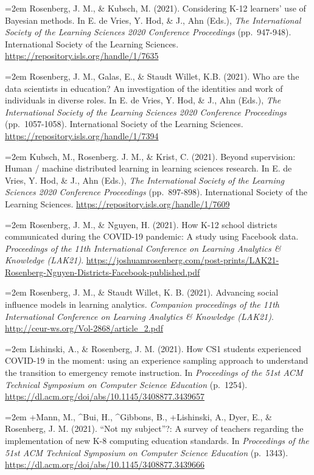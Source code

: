 \documentclass[
  14,
]{article}
\begin{document}
\hangindent=2em Rosenberg, J. M., \& Kubsch, M. (2021). Considering K-12
learners' use of Bayesian methods. In E. de Vries, Y. Hod, \& J., Ahn
(Eds.), \emph{The International Society of the Learning Sciences 2020
Conference Proceedings} (pp.~947-948). International Society of the
Learning Sciences. \url{https://repository.isls.org/handle/1/7635}

\hangindent=2em Rosenberg, J. M., Galas, E., \& Staudt Willet, K.B.
(2021). Who are the data scientists in education? An investigation of
the identities and work of individuals in diverse roles. In E. de Vries,
Y. Hod, \& J., Ahn (Eds.), \emph{The International Society of the
Learning Sciences 2020 Conference Proceedings} (pp.~1057-1058).
International Society of the Learning Sciences.
\url{https://repository.isls.org/handle/1/7394}

\hangindent=2em Kubsch, M., Rosenberg. J. M., \& Krist, C. (2021).
Beyond supervision: Human / machine distributed learning in learning
sciences research. In E. de Vries, Y. Hod, \& J., Ahn (Eds.), \emph{The
International Society of the Learning Sciences 2020 Conference
Proceedings} (pp.~897-898). International Society of the Learning
Sciences. \url{https://repository.isls.org/handle/1/7609}

\hangindent=2em Rosenberg, J. M., \& Nguyen, H. (2021). How K-12 school
districts communicated during the COVID-19 pandemic: A study using
Facebook data. \emph{Proceedings of the 11th International Conference on
Learning Analytics \& Knowledge (LAK21)}.
\url{https://joshuamrosenberg.com/post-prints/LAK21-Rosenberg-Nguyen-Districts-Facebook-published.pdf}

\hangindent=2em Rosenberg, J. M., \& Staudt Willet, K. B. (2021).
Advancing social influence models in learning analytics. \emph{Companion
proceedings of the 11th International Conference on Learning Analytics
\& Knowledge (LAK21)}. \url{http://ceur-ws.org/Vol-2868/article_2.pdf}

\hangindent=2em Lishinski, A., \& Rosenberg, J. M. (2021). How CS1
students experienced COVID-19 in the moment: using an experience
sampling approach to understand the transition to emergency remote
instruction. In \emph{Proceedings of the 51st ACM Technical Symposium on
Computer Science Education} (p.~1254).
\url{https://dl.acm.org/doi/abs/10.1145/3408877.3439657}

\hangindent=2em +Mann, M., \^{}Bui, H., \^{}Gibbons, B., +Lishinski, A.,
Dyer, E., \& Rosenberg, J. M. (2021). ``Not my subject''?: A survey of
teachers regarding the implementation of new K-8 computing education
standards. In \emph{Proceedings of the 51st ACM Technical Symposium on
Computer Science Education} (p.~1343).
\url{https://dl.acm.org/doi/abs/10.1145/3408877.3439666}
\end{document}
